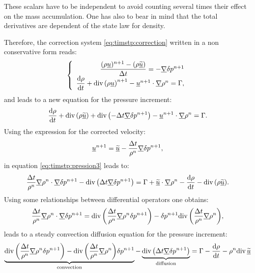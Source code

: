 These scalars have to be independent to avoid counting several times
their effect on  the mass accumulation.
One has also to bear in mind that the total derivatives are dependent of the state law for density.

Therefore, the correction system \eqref{eq:timstp:correction} written in a non conservative form reads:
\begin{equation}
\left\{
  \begin{array}{rcl}
  \dfrac{(\rho \underline{u})^{n+1} - (\rho\underline{\widetilde{u}})}{\Delta t} = - \underline{\nabla} \delta p^{n+1} \\
  \dfrac{\mathrm{d} \rho}{\mathrm{d} t} + \text{div}\,{ \left( \rho \underline{u} \right)^{n+1} } - \underline{u}^{n+1} \cdot \underline{\nabla}{\rho}^n = \Gamma,
  \end{array}
  \right.
\label{eq:timstp:correction3}
\end{equation}
and leads to a new equation for the pressure increment:
\begin{equation}
\dfrac{\mathrm{d} \rho}{\mathrm{d} t} + \text{div}\,{ \left( \rho \underline{\widetilde{u}} \right) }
+ \text{div}\,{ \left( -\Delta t \underline{\nabla} \delta p^{n+1} \right) } - \underline{u}^{n+1} \cdot \underline{\nabla}{\rho}^n = \Gamma.
\label{eq:timstp:pression3}
\end{equation}
Using the expression for the corrected velocity:
\begin{equation}
\underline{u}^{n+1} = \underline{\widetilde{u}} - \dfrac{\Delta t}{\rho^n} \underline{\nabla}{\delta p^{n+1}},
\end{equation}
in equation \eqref{eq:timstp:pression3} leads to:
%
\begin{equation}
\dfrac{\Delta t}{\rho^n} \underline{\nabla}{\rho}^n \cdot \underline{\nabla}{\delta p^{n+1}}
- \text{div}\,{ \left( \Delta t \underline{\nabla} \delta p^{n+1} \right) } = \Gamma
+ \underline{\widetilde{u}} \cdot \underline{\nabla}{\rho}^n - \dfrac{\mathrm{d} \rho}{\mathrm{d} t}
- \text{div}\,{ \left( \rho \underline{\widetilde{u}} \right) }.
\label{eq:timstp:pression4}
\end{equation}
%
Using some relationships between differential operators one obtains:
\begin{equation}
\dfrac{\Delta t}{\rho^n}\underline{\nabla}{\rho}^n \cdot \underline{\nabla}{\delta p^{n+1}}
= \text{div}\,{ \left( \dfrac{\Delta t}{\rho^n}\underline{\nabla}{\rho}^n \delta p^{n+1} \right) }
- \delta p^{n+1} \text{div}\,{ \left( \dfrac{\Delta t}{\rho^n} \underline{\nabla}{\rho^n} \right) },
\end{equation}
leads to a steady convection diffusion equation for the pressure increment:
\begin{equation}
\underbrace{ \text{div}\,{ \left( \dfrac{\Delta t}{\rho^n} \underline{\nabla}{\rho}^n \delta p^{n+1} \right) }
           - \text{div}\,{ \left( \dfrac{\Delta t}{\rho^n} \underline{\nabla}{\rho^n} \right) } \delta p^{n+1}
}_{\text{convection}}
-
\underbrace{
  \text{div}\,{ \left( \Delta t \underline{\nabla} \delta p^{n+1} \right) }
}_{\text{diffusion}}
 = \Gamma - \dfrac{\mathrm{d} \rho}{\mathrm{d} t}
- \rho^n \text{div}\,{\underline{\widetilde{u}}}
\label{eq:timstp:pression5}
\end{equation}
